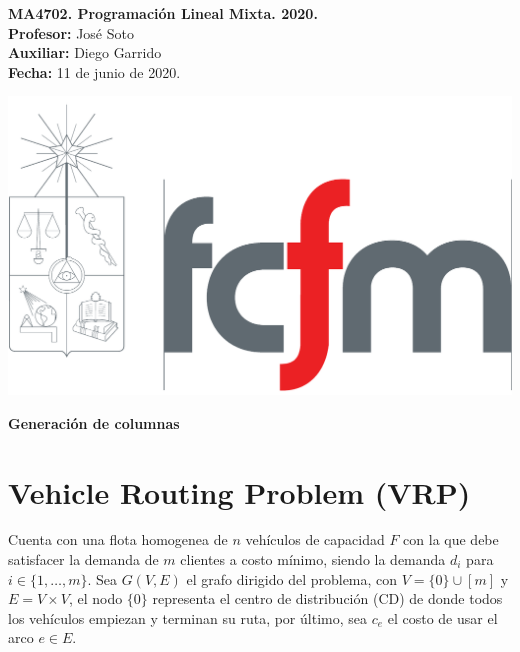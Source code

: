 \documentclass[10pt]{article}
\theoremstyle{plain}
\theoremstyle{definition}
\newcommand{\sca}{Diego Garrido}
\newcommand{\fecha}{11 de junio  de 2020}
\begin{document}
\vspace*{-1.2 cm}
\begin{minipage}{0.6\textwidth}
\begin{flushleft}
\hspace*{-0.5cm}\textbf{MA4702. Programación Lineal Mixta. 2020.}\\
\hspace*{-0.5cm}\textbf{Profesor:} José Soto\\
\hspace*{-0.5cm}\textbf{Auxiliar:} \sca\\
\hspace*{-0.5cm}\textbf{Fecha:} \fecha.
\end{flushleft}
\end{minipage}
\begin{minipage}{0.36\textwidth}
\begin{flushright}
\includegraphics[scale=0.15]{fcfm}
\end{flushright}
\end{minipage}
\bigskip

\begin{center}
\LARGE\textbf{Generación de columnas}
\end{center}

\section{Vehicle Routing Problem (VRP)}

Cuenta con una flota homogenea de $n$ vehículos de capacidad $F$ con la que debe satisfacer la demanda de $m$ clientes a costo mínimo, siendo la demanda $d_{i}$ para $i\in\{1,\ldots, m\}$. Sea $G(V,E)$ el grafo dirigido del problema, con $V=\{0\}\cup[m]$ y $E=V\times V$, el nodo $\{0\}$ representa el centro de distribución (CD) de donde todos los vehículos empiezan y terminan su ruta, por último, sea $c_{e}$ el costo de usar el arco $e\in E$.  
\end{document}
